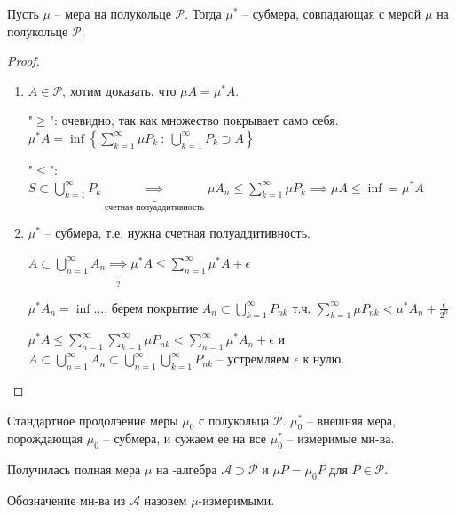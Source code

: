 \begin{theorem}
    Пусть $\mu$ -- мера на полукольце $\mathcal{P}$. Тогда $\mu^*$ -- субмера, совпадающая с мерой $\mu$ на полукольце $\mathcal{P}$.
\end{theorem}
\begin{proof}
    \begin{enumerate}
        \item {
            $A \in \mathcal{P}$, хотим доказать, что $\mu A = \mu^* A$.

            "$\geq$": очевидно, так как множество покрывает само себя. $\mu^* A = \inf\left\{ \sum_{k=1}^{\infty} \mu P_k \ : \ \bigcup_{k=1}^{\infty} P_k \supset A \right\}$

            "$\leq$": $S \subset \bigcup_{k=1}^{\infty} P_k \underbrace{\implies}_{\text{счетная полуаддитивность}} \mu A_n \leq \sum_{k=1}^{\infty} \mu P_k \implies \mu A \leq \inf = \mu^* A$
        }
        \item {
            $\mu^*$ -- субмера, т.е. нужна счетная полуаддитивность.

            $A \subset \bigcup_{n=1}^{\infty} A_n \underbrace{\implies}_{?} \mu^* A \leq \sum_{n=1}^{\infty} \mu^* A + \epsilon$

            $\mu^* A_n = \inf ... $, берем покрытие $A_n \subset \bigcup_{k=1}^{\infty} P_{nk}$ т.ч. $\sum_{k=1}^{\infty} \mu P_{nk} < \mu^* A_n + \frac{\epsilon}{2^n}$

            $\mu^* A \leq \sum_{n=1}^{\infty} \sum_{k=1}^{\infty} \mu P_{nk} < \sum_{n=1}^{\infty} \mu^* A_n + \epsilon$ и $A \subset \bigcup_{n=1}^{\infty} A_n \subset \bigcup_{n=1}^{\infty} \bigcup_{k=1}^{\infty} P_{nk}$ -- устремляем $\epsilon$ к нулю.

        }
    \end{enumerate}
\end{proof}

\begin{definition}
    Стандартное продолэение меры $\mu_0$ с полукольца $\mathcal{P}$. $\mu^*_0$ -- внешняя мера, порождающая $\mu_0$ -- субмера, и сужаем ее на все $\mu^*_0$ -- измеримые мн-ва.

    Получилась полная мера $\mu$ на \sigma-алгебра $\mathcal{A} \supset \mathcal{P}$ и $\mu P = \mu_0 P$ для $P \in \mathcal{P}$.

    Обозначение мн-ва из $\mathcal{A}$ назовем $\mu$-измеримыми.
\end{definition}

